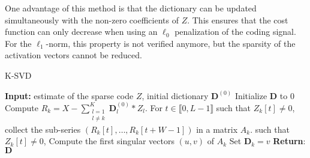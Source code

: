 \documentclass[../thesis.tex]{subfiles}
\begin{document}
	One advantage of this method is that the dictionary can be updated simultaneously with the
	non-zero coefficients of $Z$. This ensures that the cost function can only decrease when
	using an $\ell_0$ penalization of the coding signal. For the $\ell_1$-norm, this property
	is not verified anymore, but the sparsity of the activation vectors cannot be reduced.
	

	\begin{algorithm}[tp]
		\caption{K-SVD}
		\label{alg:ksvd}
		\begin{algorithmic}[1]
			\STATE \textbf{Input: } estimate of the sparse code $Z$, initial dictionary $\pmb D^{(0)}$
			\STATE Initialize $\pmb D$ to $0$  
			\STATE Compute $\displaystyle R_k = X - \sum_{\substack{l=1\\l\neq k}}^K \pmb D^{(0)}_l * Z_l$.
			\STATE For $t \in \llbracket0, L-1\rrbracket$ such that $Z_k[t] \neq 0$,\\
					collect the sub-series $(R_k[t], \dots, R_k[t+W-1])$ in a matrix $A_k$. 
	such that $Z_k[t] \neq 0$,
			\STATE Compute the first singular vectors $(u, v)$ of $A_k$
			\STATE Set $\pmb D_k = v$
			\ENDFOR
			\STATE \textbf{Return}: $\pmb D$
		\end{algorithmic}
	\end{algorithm}
	  

\end{document}
